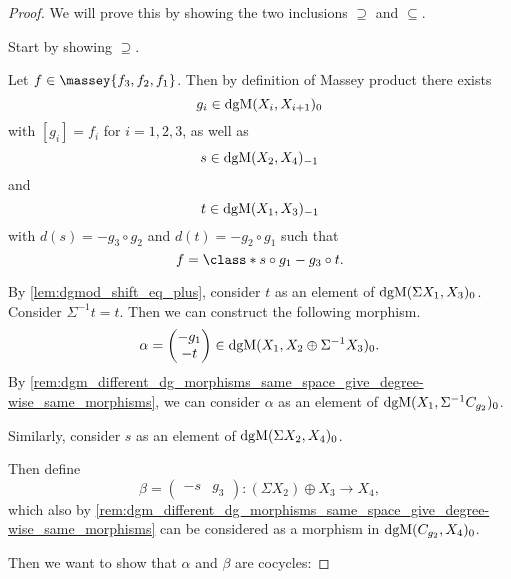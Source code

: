 \begin{proof}
    We will prove this by showing the two inclusions \( \supseteq \) and \( \subseteq \).

    Start by showing \( \supseteq \).

    Let \( f \in \massey{f_3, f_2, f_1} \). Then by definition of Massey product there exists
    \[
        g_i \in \operatorname{dgM}(X_i, X_{i + 1})_0
    \]
    with \( [g_i] = f_i \) for \( i = 1, 2, 3 \), as well as
    \[
        s \in \operatorname{dgM}(X_2, X_4)_{-1}
    \]
    and
    \[
        t \in \operatorname{dgM}(X_1, X_3)_{-1}
    \]
    with \( d(s) = - g_3 \circ g_2 \) and \( d(t) = - g_2 \circ g_1 \) such that
    \[
        f = \class*{s \circ g_1 - g_3 \circ t}.
    \]

    By \autoref{lem:dgmod_shift_eq_plus}, consider \( t \) as an element of \( \operatorname{dgM}(\Sigma X_1, X_3)_0 \). Consider \( \Sigma^{-1} t = t \). Then we can construct the following morphism.
    \[
        \alpha =
        \begin{pmatrix}
            - g_1 \\
            - t
        \end{pmatrix}
        \in \operatorname{dgM}(X_1, X_2 \oplus \Sigma^{-1} X_3)_0.
    \]
    By \autoref{rem:dgm_different_dg_morphisms_same_space_give_degree-wise_same_morphisms}, we can consider \( \alpha \) as an element of \( \operatorname{dgM}(X_1, \Sigma^{-1} C_{g_2})_0 \).

    Similarly, consider \( s \) as an element of \( \operatorname{dgM}(\Sigma X_2, X_4)_0 \).

    Then define
    \[
        \beta =
        \begin{pmatrix}
            - s & g_3
        \end{pmatrix}
        : (\Sigma X_2) \oplus X_3 \to X_4,
    \]
    which also by \autoref{rem:dgm_different_dg_morphisms_same_space_give_degree-wise_same_morphisms} can be considered as a morphism in \( \operatorname{dgM}(C_{g_2}, X_4)_0 \).

    Then we want to show that \( \alpha \) and \( \beta \) are cocycles:


\end{proof}
